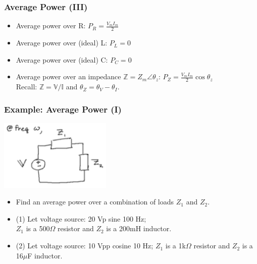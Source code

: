 \documentclass{beamer}
\begin{document}

\begin{frame}[fragile]
\frametitle{Average Power (III)}

\begin{itemize}
\item Average power over R: $P_R = \frac{V_m I_m}{2}$
\item Average power over (ideal) L: $P_L = 0$
\item Average power over (ideal) C: $P_C = 0$
\item Average power over an impedance $\mathbb{Z} = Z_m \angle \theta_z$: $P_Z =  \frac{V_m I_m}{2} \cos \theta_z$
\\ Recall: $\mathbb{Z} = \mathbb{V}/\mathbb{I}$ and $\theta_Z = \theta_V - \theta_I$.

\end{itemize}

\end{frame}


\begin{frame}[fragile]
\frametitle{Example: Average Power (I)}

\begin{center}
\includegraphics[width=0.4\textwidth]{src/APexample1.png}
\end{center}

\begin{itemize}
\item Find an average power over a combination of loads $Z_1$ and $Z_2$.
\item (1) Let voltage source: 20 Vp sine 100 Hz;
\\ 
$Z_1$ is a 500$\Omega$ resistor and $Z_2$ is a 200mH inductor.
\item (2) Let voltage source: 10 Vpp cosine 10 Hz;
$Z_1$ is a 1k$\Omega$ resistor and $Z_2$ is a 16$\mu$F inductor.
\end{itemize}

\end{frame}

\end{document}
